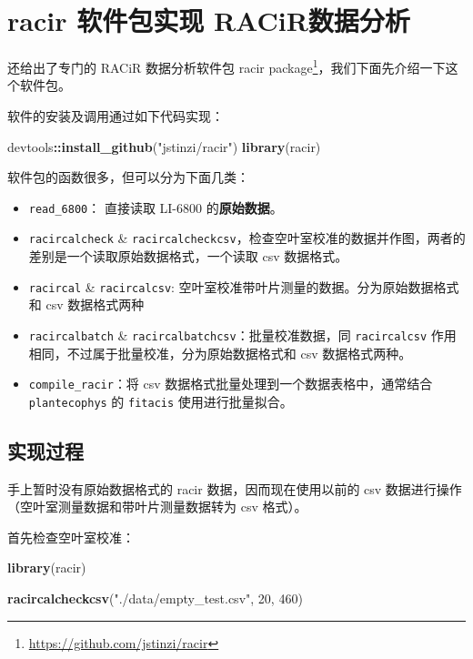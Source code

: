 \documentclass[]{krantz}
\makeatletter
\newenvironment{Shaded}{\begin{snugshade}}{\end{snugshade}}
\newcommand{\KeywordTok}[1]{\textcolor[rgb]{0.13,0.29,0.53}{\textbf{#1}}}
\newcommand{\DecValTok}[1]{\textcolor[rgb]{0.00,0.00,0.81}{#1}}
\newcommand{\StringTok}[1]{\textcolor[rgb]{0.31,0.60,0.02}{#1}}
\newcommand{\OperatorTok}[1]{\textcolor[rgb]{0.81,0.36,0.00}{\textbf{#1}}}
\newcommand{\NormalTok}[1]{#1}
\providecommand{\tightlist}{%
  \setlength{\itemsep}{0pt}\setlength{\parskip}{0pt}}
\renewcommand{\href}[2]{#2\footnote{\url{#1}}}
\newenvironment{kframe}{%
\medskip{}
\setlength{\fboxsep}{.8em}
 \def\at@end@of@kframe{}%
 \ifinner\ifhmode%
  \def\at@end@of@kframe{\end{minipage}}%
  \begin{minipage}{\columnwidth}%
 \fi\fi%
 \def\FrameCommand##1{\hskip\@totalleftmargin \hskip-\fboxsep
 \colorbox{shadecolor}{##1}\hskip-\fboxsep
     \hskip-\linewidth \hskip-\@totalleftmargin \hskip\columnwidth}%
 \MakeFramed {\advance\hsize-\width
   \@totalleftmargin\z@ \linewidth\hsize
   \@setminipage}}%
 {\par\unskip\endMakeFramed%
 \at@end@of@kframe}
\renewenvironment{Shaded}{\begin{kframe}}{\end{kframe}}
\theoremstyle{definition}
\theoremstyle{definition}
\theoremstyle{definition}
\theoremstyle{remark}
\makeatother
\begin{document}
\section{\texorpdfstring{racir 软件包实现
RACiR\texttrademark 数据分析}{racir 软件包实现 RACiR数据分析}}\label{racir_pkg}

\citet{stinziano2018} 还给出了专门的 RACiR 数据分析软件包
\href{https://github.com/jstinzi/racir}{racir
package}，我们下面先介绍一下这个软件包。

软件的安装及调用通过如下代码实现：

\begin{Shaded}
\begin{Highlighting}[]
\NormalTok{devtools}\OperatorTok{::}\KeywordTok{install_github}\NormalTok{(}\StringTok{"jstinzi/racir"}\NormalTok{)}
\KeywordTok{library}\NormalTok{(racir)}
\end{Highlighting}
\end{Shaded}

软件包的函数很多，但可以分为下面几类：

\begin{itemize}
\tightlist
\item
  \texttt{read\_6800}： 直接读取 LI-6800 的\textbf{原始数据}。
\item
  \texttt{racircalcheck} \&
  \texttt{racircalcheckcsv}，检查空叶室校准的数据并作图，两者的差别是一个读取原始数据格式，一个读取
  csv 数据格式。
\item
  \texttt{racircal} \& \texttt{racircalcsv}:
  空叶室校准带叶片测量的数据。分为原始数据格式和 csv 数据格式两种
\item
  \texttt{racircalbatch} \& \texttt{racircalbatchcsv}：批量校准数据，同
  \texttt{racircalcsv} 作用相同，不过属于批量校准，分为原始数据格式和
  csv 数据格式两种。
\item
  \texttt{compile\_racir}：将 csv
  数据格式批量处理到一个数据表格中，通常结合 \texttt{plantecophys} 的
  \texttt{fitacis} 使用进行批量拟合。
\end{itemize}

\subsection{实现过程}\label{racir_pkg_real}

手上暂时没有原始数据格式的 racir 数据，因而现在使用以前的 csv
数据进行操作（空叶室测量数据和带叶片测量数据转为 csv 格式）。

首先检查空叶室校准：

\begin{Shaded}
\begin{Highlighting}[]
\KeywordTok{library}\NormalTok{(racir)}

\KeywordTok{racircalcheckcsv}\NormalTok{(}\StringTok{"./data/empty_test.csv"}\NormalTok{, }\DecValTok{20}\NormalTok{, }\DecValTok{460}\NormalTok{)}
\end{Highlighting}
\end{Shaded}
\end{document}
